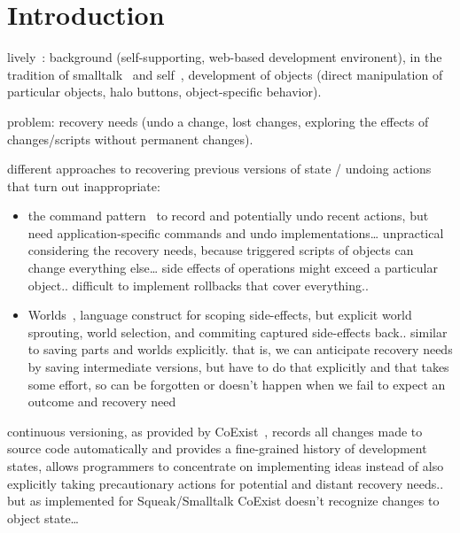 
\section{Introduction} \label{sec:INTRODUCTION}

lively~\cite{Ingalls2008LKS,Krahn2009LWD}: background (self-supporting, web-based development environent), in the tradition of smalltalk~\cite{GoldbergRobson83} and self~\cite{Ungar1987SPS,Ungar2007SEL}, development of objects (direct manipulation of particular objects, halo buttons, object-specific behavior).

problem: recovery needs (undo a change, lost changes, exploring the effects of changes/scripts without permanent changes).


different approaches to recovering previous versions of state / undoing actions that turn out inappropriate:
\begin{itemize}
    \item the command pattern~\cite{GammaHelmJohnsonVlissides95} to record and potentially undo recent actions, but need application-specific commands and undo implementations… unpractical considering the  recovery needs, because triggered scripts of objects can change everything else… side effects of operations might exceed a particular object.. difficult to implement rollbacks that cover everything..
    \item Worlds~\cite{Warth2011Wor}, language construct for scoping side-effects, but explicit world sprouting, world selection, and commiting captured side-effects back.. similar to saving parts and worlds explicitly. that is, we can anticipate recovery needs by saving intermediate versions, but have to do that explicitly and that takes some effort, so can be forgotten or doesn’t happen when we fail to expect an outcome and recovery need
\end{itemize}





continuous versioning, as provided by CoExist~\cite{Steinert2012COE}, records all changes made to source code automatically and provides a fine-grained history of development states, allows programmers to concentrate on implementing ideas instead of also explicitly taking precautionary actions for potential and distant recovery needs..
but as implemented for Squeak/Smalltalk CoExist doesn’t recognize changes to object state…

